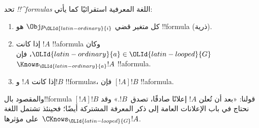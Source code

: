 \documentclass[../../../include/open-logic-section]{subfiles}
\begin{document}
\begin{defn}
  تحد \emph{!!^{formula}s} اللغة المعرفية استقرائيًا كما يأتي:
  \begin{enumerate}


  \item كل متغير قضي $\Obj p_{\OLId{latin-ordinary}{i}}$ هو !!{formula} (ذرية).






  \item إذا كانت $!A$ !!a{formula} وكان ${\OLId{latin-ordinary}{a}} \in {\OLId{latin-looped}{G}}$، فإن $\Knows_{\OLId{latin-ordinary}{a}} !A$
  !!a{formula}.
  
  \item إذا كانت $!A$ و$!B$ !!{formula}s، فإن $[!A] !B$ !!a{formula}.

\end{enumerate}
\end{defn}

والمقصود بال!!{formula} $[!A] !B$ قولنا: «بعد أن تُعلن $!A$ إعلانًا
صادقًا، تصدق~$!B$.» وقد نحتاج في باب الإعلانات العامة إلى ذكر المعرفة
المشتركة أيضًا؛ فحينئذ تشتمل اللغة على مؤثرها~$\CKnows_{\OLId{latin-looped}{G}} !A$.
\end{document}
